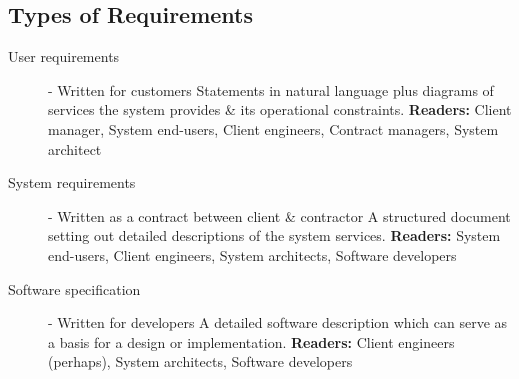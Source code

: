 \documentclass{report}
\begin{document}
\subsection{Types of Requirements}
\begin{description}
  \item [User requirements] - Written for customers\newline
  Statements in natural language plus diagrams of services the system provides \& its operational constraints.\newline
  \textbf{Readers:} Client manager, System end-users, Client engineers, Contract managers, System architect
  \item [System requirements] - Written as a contract between client \& contractor \newline
  A structured document setting out detailed descriptions of the system services.\newline
  \textbf{Readers:} System end-users, Client engineers, System architects, Software developers
  \item [Software specification] - Written for developers \newline
  A detailed software description which can serve as a basis for a design or implementation. \newline
  \textbf{Readers:} Client engineers (perhaps), System architects, Software developers
\end{description}
\end{document}
